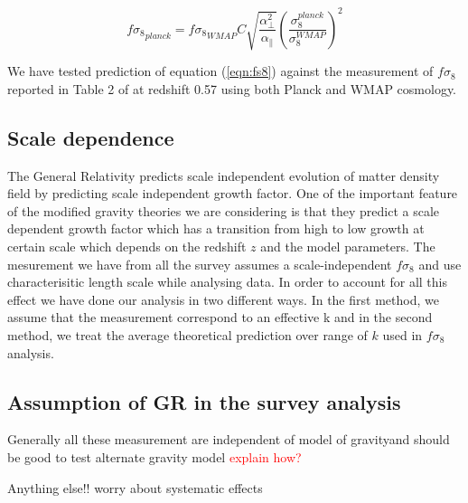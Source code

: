 \begin{equation}
{f\sigma_8}_{planck} = {f\sigma_8}_{WMAP} C \sqrt{\frac{\alpha_\perp^2}{\alpha_\parallel} } \left(\frac{\sigma_8^{planck}}{\sigma_8^{WMAP}} \right)^2
\label{eqn:fs8}
\end{equation}

We have tested prediction of equation (\ref{eqn:fs8}) against the measurement of $f\sigma_8$ reported in Table 2 of \citet{Alam2015} at redshift 0.57 using both Planck and WMAP cosmology.

\subsection{Scale dependence}

The General Relativity predicts scale independent evolution of matter density field by predicting scale independent growth factor. One of the important feature of the modified gravity theories we are considering is that they predict a scale dependent growth factor which has a transition from high to low growth at certain scale which depends on the redshift $z$  and the model parameters. 
The mesurement we have from all the survey assumes a scale-independent $f\sigma_8$ and use characterisitic length scale while analysing data. In order to account for all this effect we have done our analysis in two different ways. In the first method, we assume that the measurement correspond to an effective k and in the second method, we treat the average theoretical prediction over range of $k$ used in  $f\sigma_8$  analysis.

%

\subsection{Assumption of GR in the survey analysis}
Generally all these measurement are independent of model of gravityand should be good to test alternate gravity model \textcolor{red}{explain how?}


Anything else!!
worry about systematic effects